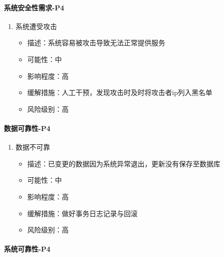 \documentclass[hyperref, a4paper]{ctexart}
\providecommand{\tightlist}{%
  \setlength{\itemsep}{0pt}\setlength{\parskip}{0pt}}
\let\oldparagraph\paragraph
\renewcommand{\paragraph}[1]{\oldparagraph{#1}\mbox{}}
\begin{document}
\hypertarget{ux7cfbux7edfux5b89ux5168ux6027ux9700ux6c42-p4}{%
\paragraph{系统安全性需求-P4}\label{ux7cfbux7edfux5b89ux5168ux6027ux9700ux6c42-p4}}

\begin{enumerate}
\def\labelenumi{\arabic{enumi}.}
\tightlist
\item
  系统遭受攻击

  \begin{itemize}
  \tightlist
  \item
    描述：系统容易被攻击导致无法正常提供服务
  \item
    可能性：中
  \item
    影响程度：高
  \item
    缓解措施：人工干预，发现攻击时及时将攻击者ip列入黑名单
  \item
    风险级别：高
  \end{itemize}
\end{enumerate}

\hypertarget{ux6570ux636eux53efux9760ux6027-p4}{%
\paragraph{数据可靠性-P4}\label{ux6570ux636eux53efux9760ux6027-p4}}

\begin{enumerate}
\def\labelenumi{\arabic{enumi}.}
\tightlist
\item
  数据不可靠

  \begin{itemize}
  \tightlist
  \item
    描述：已变更的数据因为系统异常退出，更新没有保存至数据库
  \item
    可能性：中
  \item
    影响程度：高
  \item
    缓解措施：做好事务日志记录与回滚
  \item
    风险级别：高
  \end{itemize}
\end{enumerate}

\hypertarget{ux7cfbux7edfux53efux9760ux6027-p4}{%
\paragraph{系统可靠性-P4}\label{ux7cfbux7edfux53efux9760ux6027-p4}}
\end{document}
